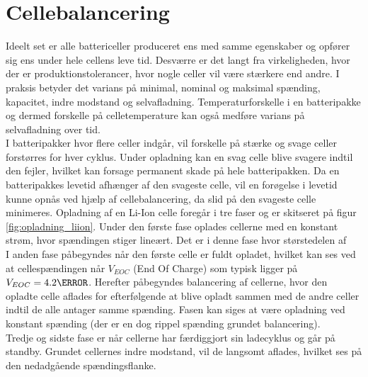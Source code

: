 \section{Cellebalancering}
Ideelt set er alle battericeller produceret ens med samme egenskaber og opfører sig ens under hele cellens leve tid. Desværre er det langt fra virkeligheden, hvor der er produktionstolerancer, hvor nogle celler vil være stærkere end andre. I praksis betyder det varians på minimal, nominal og maksimal spænding, kapacitet, indre modstand og selvafladning.
Temperaturforskelle i en batteripakke og dermed forskelle på celletemperature kan også medføre varians på selvafladning over tid.
\\

I batteripakker hvor flere celler indgår, vil forskelle på stærke og svage celler forstørres for hver cyklus. Under opladning kan en svag celle blive svagere indtil den fejler, hvilket kan forsage permanent skade på hele batteripakken. Da en batteripakkes levetid afhænger af den svageste celle, vil en forøgelse i levetid kunne opnås ved hjælp af cellebalancering, da slid på den svageste celle minimeres. Opladning af en Li-Ion celle foregår i tre faser og er skitseret på figur \ref{fig:opladning_liion}.
Under den første fase oplades cellerne med en konstant strøm, hvor spændingen stiger lineært. Det er i denne fase hvor størstedelen af
\\

I anden fase påbegyndes når den første celle er fuldt opladet, hvilket kan ses ved at cellespændingen når $V_{EOC}$ (End Of Charge) som typisk ligger på $V_{EOC} = 4.2 \volt$. Herefter påbegyndes balancering af cellerne, hvor den opladte celle aflades for efterfølgende at blive opladt sammen med de andre celler indtil de alle antager samme spænding.
Fasen kan siges at være opladning ved konstant spænding (der er en dog rippel spænding grundet balancering).
\\

Tredje og sidste fase er når cellerne har færdiggjort sin ladecyklus og går på standby. Grundet cellernes indre modstand, vil de langsomt aflades, hvilket ses på den nedadgående spændingsflanke.


